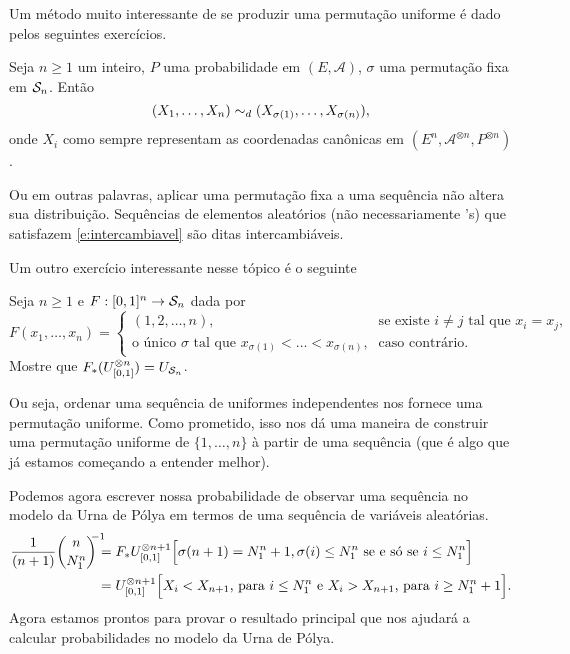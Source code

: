 \begin{topics}
Um método muito interessante de se produzir uma permutação uniforme é dado pelos seguintes exercícios.

\begin{exercise}
  Seja $n \geq 1$ um inteiro, $P$ uma probabilidade em $(E, \mathcal{A})$, $\sigma$ uma permutação fixa em ${\mathcal S}_n$.
  Então
  \begin{equation}
    \label{e:intercambiavel}
    (X_1, \dots, X_n) \sim_d (X_{\sigma(1)}, \dots, X_{\sigma(n)}),
  \end{equation}
  onde $X_i$ como sempre representam as coordenadas canônicas em $(E^{n}, \mathcal{A}^{\otimes n}, P^{\otimes n})$.
\end{exercise}

Ou em outras palavras, aplicar uma permutação fixa a uma sequência \iid não altera sua distribuição.
Sequências de elementos aleatórios (não necessariamente \iid's) que satisfazem \eqref{e:intercambiavel} são ditas intercambiáveis. 

Um outro exercício interessante nesse tópico é o seguinte
\begin{exercise}
  Seja $n \geq 1$ e $F:[0,1]^n \to {\ensuremath{\mathcal S}}_n$ dada por
  \begin{equation*}
    F(x_1, \dots, x_n) =
    \begin{cases}
      (1, 2, \dots, n), \quad & \text{se existe $i \neq j$ tal que $x_i = x_j$, }\\
      \text{o único $\sigma$ tal que $x_{\sigma(1)} < \dots < x_{\sigma(n)}$,} & \text{caso contrário.}
    \end{cases}
  \end{equation*}
  Mostre que $F_*(U_{[0,1]}^{\otimes n}) = U_{{\mathcal S}_n}$.
\end{exercise}

Ou seja, ordenar uma sequência de uniformes independentes nos fornece uma permutação uniforme.
Como prometido, isso nos dá uma maneira de construir uma permutação uniforme de $\{1, \dots, n\}$ à partir de uma sequência \iid (que é algo que já estamos começando a entender melhor).

Podemos agora escrever nossa probabilidade de observar uma sequência no modelo da 
Urna de Pólya em termos de uma sequência \iid de variáveis aleatórias.
\begin{equation*}
  \begin{split}
    \frac{1}{(n+1)} \binom{n}{N^n_1}^{\mathclap{\;-1}} & =
    F_{*} U_{[0,1]}^{\otimes n+1} \Big[ \sigma(n+1) = N^n_1 + 1, \sigma(i) \leq N^n_1 \text{ se e só se } i \leq N^n_1 \Big]\\
    & =  U^{\otimes n+1}_{[0,1]} \Big[ \text{$X_i < X_{n+1}$, para $i \leq N^n_1$ e $X_i > X_{n+1}$, para $i \ge N^n_1+1$} \Big].
  \end{split}
\end{equation*}
Agora estamos prontos para provar o resultado principal que nos ajudará a calcular probabilidades no modelo da Urna de Pólya.


\end{topics}
